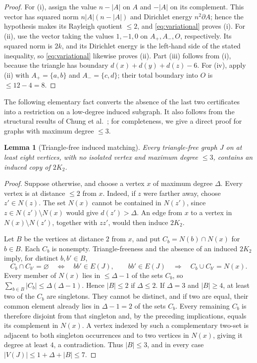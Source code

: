 \documentclass[11pt]{article}
\numberwithin{equation}{section}
\newtheorem{lemma}[theorem]{Lemma}
\theoremstyle{definition}
\theoremstyle{remark}
\begin{document}
\begin{proof}
For (i), assign the value \(n-|A|\) on \(A\) and \(-|A|\) on its
complement.  This vector has squared norm \(n|A|(n-|A|)\) and Dirichlet
energy \(n^2\partial A\); hence the hypothesis makes its Rayleigh quotient
\(\le2\), and \eqref{eq:variational} proves (i).  For (ii), use the vector
taking the values \(1,-1,0\) on \(A_+,A_-,O\), respectively.  Its squared
norm is \(2k\), and its Dirichlet energy is the left-hand side of the stated
inequality, so \eqref{eq:variational} likewise proves (ii).  Part (iii)
follows from (i), because the triangle has boundary
\(d(x)+d(y)+d(z)-6\).  For (iv), apply (ii) with \(A_+=\{a,b\}\) and
\(A_-=\{c,d\}\); their total boundary into \(O\) is \(\le12-4=8\).
\end{proof}

The following elementary fact converts the absence of the last two
certificates into a restriction on a low-degree induced subgraph.  It also
follows from the structural results of Chung et
al.~\cite[Corollary to Theorem~1 and Theorem~2]{chung1990}; for completeness,
we give a direct proof for graphs with maximum degree \(\le3\).

\begin{lemma}[Triangle-free induced matching]
\label{lem:triangle-free-induced-matching}
Every triangle-free graph \(J\) on at least eight vertices, with no
isolated vertex and maximum degree \(\le3\), contains an induced
copy of \(2K_2\).
\end{lemma}

\begin{proof}
Suppose otherwise, and choose a vertex \(x\) of maximum degree
\(\Delta\).  Every vertex is at distance \(\le2\) from \(x\).
Indeed, if \(z\) were farther away, choose \(z'\in N(z)\).  The set
\(N(x)\) cannot be contained in \(N(z')\), since
\(z\in N(z')\setminus N(x)\) would give \(d(z')>\Delta\).  An edge
from \(x\) to a vertex in \(N(x)\setminus N(z')\), together with
\(zz'\), would then induce \(2K_2\).

Let \(B\) be the vertices at distance \(2\) from \(x\), and put
\(C_b=N(b)\cap N(x)\) for \(b\in B\).  Each \(C_b\) is nonempty.
Triangle-freeness and the absence of an induced \(2K_2\) imply, for
distinct \(b,b'\in B\),
\[
 C_b\cap C_{b'}=\varnothing\quad\Longleftrightarrow\quad bb'\in E(J),
 \qquad
 bb'\in E(J)\quad\Longrightarrow\quad C_b\cup C_{b'}=N(x).
\]
Every member of \(N(x)\) lies in \(\le\Delta-1\) of the sets
\(C_b\), so \(\sum_{b\in B}|C_b|\le\Delta(\Delta-1)\).  Hence
\(|B|\le2\) if \(\Delta\le2\).  If \(\Delta=3\) and \(|B|\ge4\),
at least two of the \(C_b\) are singletons.  They cannot be distinct,
and if two are equal, their common element already lies in
\(\Delta-1=2\) of the sets \(C_b\).  Every remaining \(C_b\) is therefore
disjoint from that singleton and, by the preceding implications, equals its
complement in \(N(x)\).  A vertex indexed by such a complementary
two-set is adjacent to both singleton occurrences and to two vertices in
\(N(x)\), giving it degree at least \(4\), a contradiction.  Thus
\(|B|\le3\), and in every case
\(|V(J)|\le1+\Delta+|B|\le7\).
\end{proof}
\end{document}
